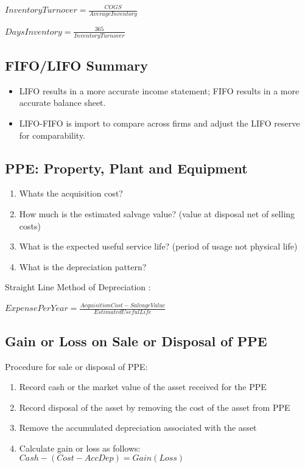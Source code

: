 $InventoryTurnover = \frac{COGS}{AverageInventory}$ \

$DaysInventory = \frac{365}{InventoryTurnover}$ \

\subsection*{FIFO/LIFO Summary}

\begin{itemize}[noitemsep,topsep=0pt]
	\item LIFO results in a more accurate income statement; FIFO results in a more accurate balance sheet.
	\item LIFO-FIFO is import to compare across firms and adjust the LIFO reserve for comparability.
\end{itemize}


\subsection*{PPE: Property, Plant and Equipment}

\begin{enumerate}[noitemsep,topsep=0pt]
	\item Whats the acquisition cost?
	\item How much is the estimated salvage value? (value at disposal net of selling costs)
	\item What is the expected useful service life? (period of usage not physical life)
	\item What is the depreciation pattern?
\end{enumerate}
	
Straight Line Method of Depreciation : 

$ExpensePerYear = \frac{AcquisitionCost - SalvageValue}{EstimatedUsefulLife}$ \


\subsection*{Gain or Loss on Sale or Disposal of PPE}
Procedure for sale or disposal of PPE:
\begin{enumerate}[noitemsep,topsep=0pt]
	\item Record cash or the market value of the asset received for the PPE
	\item Record disposal of the asset by removing the cost of the asset from PPE
	\item Remove the accumulated depreciation associated with the asset
	\item Calculate gain or loss as follows: \\  
	$ Cash - (Cost - AccDep) = Gain (Loss) $
\end{enumerate}


